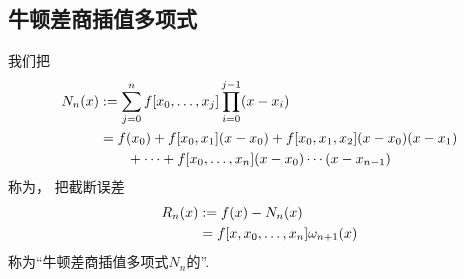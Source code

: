 \subsection{牛顿差商插值多项式}
我们把\begin{align*}
	N_n(x)
	&:=
	\sum_{j=0}^n f[x_0,\dotsc,x_j] \prod_{i=0}^{j-1} (x-x_i) \\
	&= f(x_0)
	+ f[x_0,x_1] (x-x_0)
	+ f[x_0,x_1,x_2] (x-x_0)(x-x_1) \\
	&\hspace{20pt}+ \dotsb
	+ f[x_0,\dotsc,x_n] (x-x_0)\dotsm(x-x_{n-1})
\end{align*}
称为，
把截断误差\begin{align*}
	R_n(x)
	&:=
	f(x) - N_n(x) \\
	&= f[x,x_0,\dotsc,x_n] \omega_{n+1}(x)
\end{align*}
称为“牛顿差商插值多项式\(N_n\)的”.
